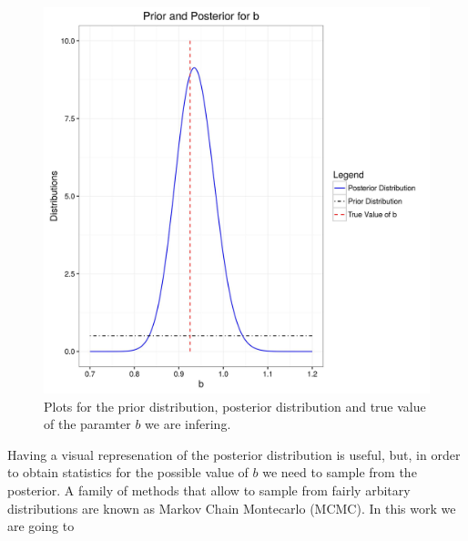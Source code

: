 \documentclass[12pt]{book}
\newcommand{\post}{\mathbb{P}_{post}}
\begin{document}
\begin{figure}[H]
\centering
\includegraphics[scale=0.8]{./FigChap3/prior_posterior.jpg}
\caption{Plots for the prior distribution, posterior distribution and true value of the paramter $b$ we are infering.}
\label{figlikeprior}
\end{figure} 
Having a visual represenation of the posterior distribution is useful, but, in order to obtain statistics
for the possible value of $b$ we need to sample from the posterior. A family of methods that allow to sample
from fairly arbitary distributions are known as Markov Chain Montecarlo (MCMC). In this work we are going to 
\end{document}
